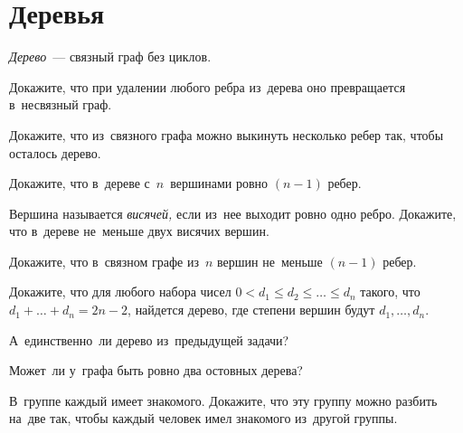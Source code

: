 
\section*{Деревья}

\emph{Дерево}~--- связный граф без циклов.

\begin{problems}

\item
Докажите, что при удалении любого ребра из~дерева оно превращается в~несвязный
граф.

\item
Докажите, что из~связного графа можно выкинуть несколько ребер так, чтобы
осталось дерево.

\item
Докажите, что в~дереве с~$n$~вершинами ровно $(n - 1)$ ребер.

\item
Вершина называется \emph{висячей,} если из~нее выходит ровно одно ребро.
Докажите, что в~дереве не~меньше двух висячих вершин.

\item
Докажите, что в~связном графе из~$n$ вершин не~меньше $(n - 1)$ ребер.




\item
Докажите, что для любого набора чисел
\(
    0 < d_1 \leq d_2 \leq \ldots \leq d_n
\)
такого, что $d_1 + \ldots + d_n = 2 n - 2$, найдется дерево, где степени вершин
будут $d_1, \ldots, d_n$.

\item
А~единственно~ли дерево из~предыдущей задачи?

\item
Может~ли у~графа быть ровно два остовных дерева?

\item
В~группе каждый имеет знакомого.
Докажите, что эту группу можно разбить на~две так, чтобы каждый человек имел
знакомого из~другой группы.


\end{problems}
